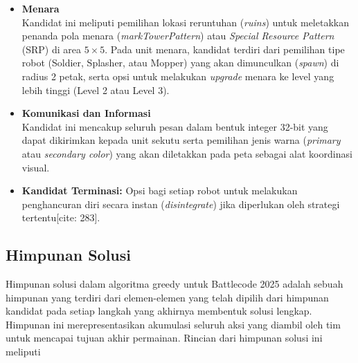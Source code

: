 \begin{itemize}
    \item \textbf{Menara}\\
          Kandidat ini meliputi pemilihan lokasi reruntuhan (\textit{ruins}) untuk meletakkan penanda pola menara (\textit{markTowerPattern}) atau \textit{Special Resource Pattern} (SRP) di area $5\times5$. Pada unit menara, kandidat terdiri dari pemilihan tipe robot (Soldier, Splasher, atau Mopper) yang akan dimunculkan (\textit{spawn}) di radius 2 petak, serta opsi untuk melakukan \textit{upgrade} menara ke level yang lebih tinggi (Level 2 atau Level 3).

    \item \textbf{Komunikasi dan Informasi}\\
          Kandidat ini mencakup seluruh pesan dalam bentuk integer 32-bit yang dapat dikirimkan kepada unit sekutu serta pemilihan jenis warna (\textit{primary} atau \textit{secondary color}) yang akan diletakkan pada peta sebagai alat koordinasi visual.

    \item \textbf{Kandidat Terminasi:} Opsi bagi setiap robot untuk melakukan penghancuran diri secara instan (\textit{disintegrate}) jika diperlukan oleh strategi tertentu[cite: 283].
\end{itemize}

\subsection{Himpunan Solusi}

Himpunan solusi dalam algoritma greedy untuk Battlecode 2025 adalah sebuah himpunan yang terdiri dari elemen-elemen yang telah dipilih dari himpunan kandidat pada setiap langkah yang akhirnya membentuk solusi lengkap. Himpunan ini merepresentasikan akumulasi seluruh aksi yang diambil oleh tim untuk mencapai tujuan akhir permainan. Rincian dari himpunan solusi ini meliputi

